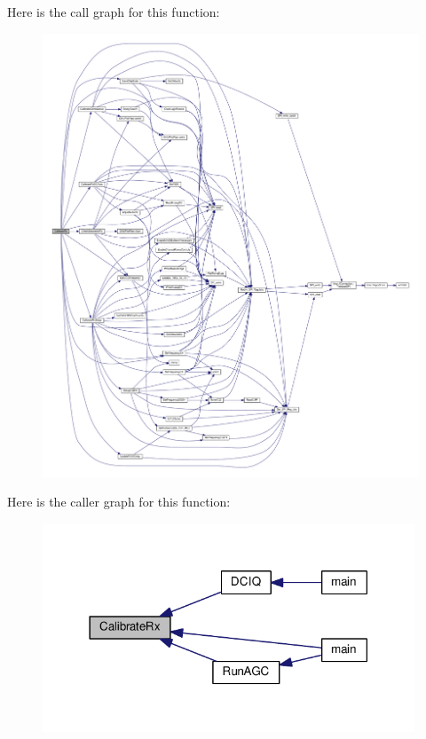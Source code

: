 Here is the call graph for this function\+:
\nopagebreak
\begin{figure}[H]
\begin{center}
\leavevmode
\includegraphics[width=350pt]{d1/dc7/lms7002m__calibrations_8h_a69b1e143409bc9a1c0b53f360bf608cf_cgraph}
\end{center}
\end{figure}




Here is the caller graph for this function\+:
\nopagebreak
\begin{figure}[H]
\begin{center}
\leavevmode
\includegraphics[width=314pt]{d1/dc7/lms7002m__calibrations_8h_a69b1e143409bc9a1c0b53f360bf608cf_icgraph}
\end{center}
\end{figure}


